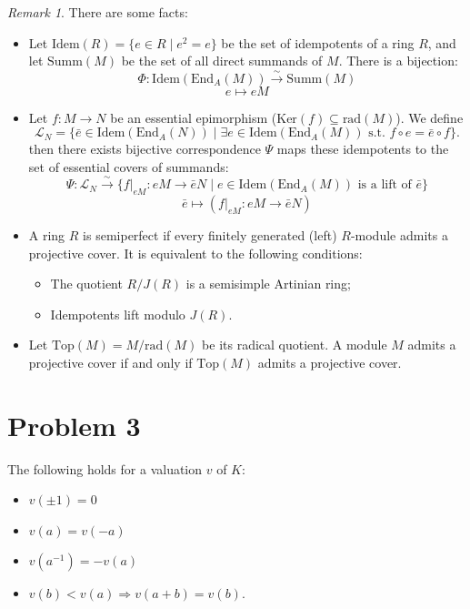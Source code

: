 \documentclass[12pt, a4paper]{article}
\theoremstyle{remark}
\newtheorem*{remark}{Remark}
\begin{document}
\begin{remark}
    There are some facts:
    \begin{itemize}
        \item Let $\text{Idem}(R) = \{e \in R \mid e^2 = e\}$ be the set of idempotents of a ring $R$, and let $\text{Summ}(M)$ be the set of all direct summands of $M$. There is a bijection:$$\Phi: \text{Idem}(\text{End}_A(M)) \xrightarrow{\sim} \text{Summ}(M)$$$$e \mapsto eM$$
        \item  Let $f: M \to N$ be an essential epimorphism ($\text{Ker}(f) \subseteq \text{rad}(M)$). We define $$\mathcal{L}_N = \{ \bar{e} \in \text{Idem}(\text{End}_A(N)) \mid \exists e \in \text{Idem}(\text{End}_A(M)) \text{ s.t. } f \circ e = \bar{e} \circ f \}.$$
        then there exists bijective correspondence $\Psi$ maps these idempotents to the set of essential covers of summands: $$\Psi: \mathcal{L}_N \xrightarrow{\sim} \{ f|_{eM} : eM \to \bar{e}N \mid e \in \text{Idem}(\text{End}_A(M)) \text{ is a lift of } \bar{e} \}$$$$\bar{e} \mapsto (f|_{eM} : eM \to \bar{e}N)$$
        \item A ring $R$ is semiperfect if every finitely generated (left) $R$-module admits a projective cover.
        It is equivalent to the following conditions:
        \begin{itemize}
            \item[a] The quotient $R/J(R)$ is a semisimple Artinian ring;
            \item[b] Idempotents lift modulo $J(R)$.
        \end{itemize}
        \item  Let $\text{Top}(M) = M/\text{rad}(M)$ be its radical quotient. A module $M$ admits a projective cover if and only if $\text{Top}(M)$ admits a projective cover.
    \end{itemize}
\end{remark}

\section*{Problem 3}
The following holds for a valuation $v$ of $K$:
\begin{itemize}
    \item[(i)] $v(\pm 1) = 0$
    \item[(ii)] $v(a) = v(-a)$
    \item[(iii)] $v(a^{-1}) = -v(a)$
    \item[(iv)] $v(b) < v(a) \Rightarrow v(a + b) = v(b)$.
\end{itemize}
\end{document}
